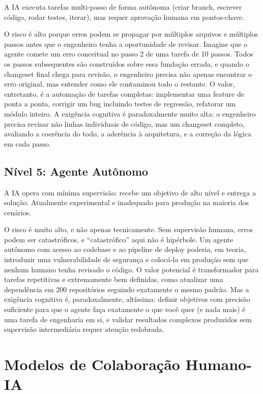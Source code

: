A IA executa tarefas multi-passo de forma autônoma (criar branch, escrever
código, rodar testes, iterar), mas requer aprovação humana em pontos-chave.

O risco é alto porque erros podem se propagar por múltiplos arquivos e múltiplos
passos antes que o engenheiro tenha a oportunidade de revisar. Imagine que o agente
comete um erro conceitual no passo 2 de uma tarefa de 10 passos. Todos os passos
subsequentes são construídos sobre essa fundação errada, e quando o changeset final
chega para revisão, o engenheiro precisa não apenas encontrar o erro original, mas
entender como ele contaminou todo o restante. O valor, entretanto, é a automação
de tarefas completas: implementar uma feature de ponta a ponta, corrigir um bug
incluindo testes de regressão, refatorar um módulo inteiro. A exigência cognitiva
é paradoxalmente muito alta: o engenheiro precisa revisar não linhas individuais de
código, mas um changeset completo, avaliando a coerência do todo, a aderência à
arquitetura, e a correção da lógica em cada passo.

\subsection{Nível 5: Agente Autônomo}

A IA opera com mínima supervisão: recebe um objetivo de alto nível e
entrega a solução. Atualmente experimental e inadequado para produção na
maioria dos cenários.

O risco é muito alto, e não apenas tecnicamente. Sem supervisão humana, erros podem
ser catastróficos, e ``catastrófico'' aqui não é hipérbole. Um agente autônomo com
acesso ao codebase e ao pipeline de deploy poderia, em teoria, introduzir uma
vulnerabilidade de segurança e colocá-la em produção sem que nenhum humano tenha
revisado o código. O valor potencial é transformador para tarefas repetitivas e
extremamente bem definidas, como atualizar uma dependência em 200 repositórios
seguindo exatamente o mesmo padrão. Mas a exigência cognitiva é, paradoxalmente,
altíssima: definir objetivos com precisão suficiente para que o agente faça
exatamente o que você quer (e nada mais) é uma tarefa de engenharia em si, e
validar resultados complexos produzidos sem supervisão intermediária requer atenção
redobrada.

\section{Modelos de Colaboração Humano-IA}


